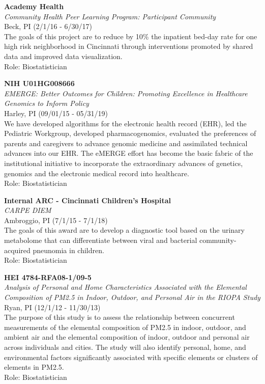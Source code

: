 \documentclass{nihbiosketch}
\begin{document}
\bigskip

\textbf{Academy Health}\\
\emph{Community Health Peer Learning Program: Participant Community}\\
Beck, PI (2/1/16 - 6/30/17)\\
The goals of this project are to reduce by 10\% the inpatient bed-day
rate for one high risk neighborhood in Cincinnati through interventions
promoted by shared data and improved data visualization.\\
Role: Biostatistician

\bigskip

\textbf{NIH U01HG008666}\\
\emph{EMERGE: Better Outcomes for Children: Promoting Excellence in
	Healthcare Genomics to Inform Policy}\\
Harley, PI (09/01/15 - 05/31/19)\\
We have developed algorithms for the electronic health record (EHR), led
the Pediatric Workgroup, developed pharmacogenomics, evaluated the
preferences of parents and caregivers to advance genomic medicine and
assimilated technical advances into our EHR. The eMERGE effort has
become the basic fabric of the institutional initiative to incorporate
the extraordinary advances of genetics, genomics and the electronic
medical record into healthcare.\\
Role: Biostatistician

\bigskip

\textbf{Internal ARC - Cincinnati Children's Hospital}\\
\emph{CARPE DIEM}\\
Ambroggio, PI (7/1/15 - 7/1/18)\\
The goals of this award are to develop a diagnostic tool based on the
urinary metabolome that can differentiate between viral and bacterial
community-acquired pneunomia in children.\\
Role: Biostatistician

\bigskip

\textbf{HEI 4784-RFA08-1/09-5}\\
\emph{Analysis of Personal and Home Characteristics Associated with the
	Elemental Composition of PM2.5 in Indoor, Outdoor, and Personal Air in
	the RIOPA Study}\\
Ryan, PI (12/1/12 - 11/30/13)\\
The purpose of this study is to assess the relationship between
concurrent measurements of the elemental composition of PM2.5 in indoor,
outdoor, and ambient air and the elemental composition of indoor,
outdoor and personal air across individuals and cities. The study will
also identify personal, home, and environmental factors significantly
associated with specific elements or clusters of elements in PM2.5.\\
Role: Biostatistician
\end{document}
